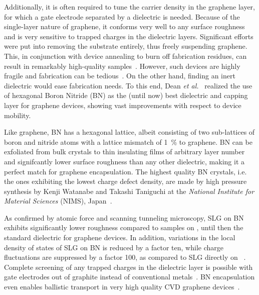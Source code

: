 Additionally, it is often required to tune the carrier density in the graphene layer, for which a gate electrode separated by a dielectric is needed.
% 
Because of the single-layer nature of graphene, it conforms very well to any surface roughness and is very sensitive to trapped charges in the dielectric layers.
%
Significant efforts were put into removing the substrate entirely, thus freely suspending graphene.
%
This, in conjunction with device annealing to burn off fabrication residues, can result in remarkably high-quality samples~\cite{duApproachingBallisticTransport2008a,rickhausBallisticInterferencesSuspended2013,mizunoBallisticlikeSupercurrentSuspended2013a,kiHighQualityMultiterminalSuspended2013,maurandFabricationBallisticSuspended2014,rickhausGateTuneableBeamsplitter2015,rickhausGuidingElectronsFewMode2015}.
% 
However, such devices are highly fragile and fabrication can be tedious~\cite{rickhausElectronOpticsBallistic2015}.
%
On the other hand, finding an inert dielectric would ease fabrication needs.
%
To this end, Dean \textit{et al.}~\cite{deanBoronNitrideSubstrates2010} realized the use of hexagonal Boron Nitride (BN) as the (until now) best dielectric and capping layer for graphene devices, showing vast improvements with respect to device mobility.


Like graphene, BN has a hexagonal lattice, albeit consisting of two sub-lattices of boron and nitride atoms with a lattice mismatch of \SI{1}{\percent} to graphene.
% 
BN can be exfoliated from bulk crystals to thin insulating films of arbitrary layer number and signifcantly lower surface roughness than any other dielectric, making it a perfect match for graphene encapsulation.
% 
The highest quality BN crystals, i.e. the ones exhibiting the lowest charge defect density, are made by high pressure synthesis by Kenji Watanabe and Takashi Taniguchi at the \textit{National Institute for Material Sciences} (NIMS), Japan~\cite{taniguchiSynthesisHighpurityBoron2007,zastrowMeetCrystalGrowers2019}.

As confirmed by atomic force and scanning tunneling microscopy, SLG on BN exhibits significantly lower roughness compared to samples on , until then the standard dielectric for graphene devices.
% 
In addition, variations in the local density of states of SLG on BN is reduced by a factor ten, while charge fluctuations are suppressed by a factor 100, as compared to SLG directly on ~\cite{xueScanningTunnellingMicroscopy2011,deckerLocalElectronicProperties2011}.
% 
Complete screening of any trapped charges in the dielectric layer is possible with gate electrodes out of graphite instead of conventional metals~\cite{ponomarenkoTunableMetalInsulator2011,ametNovelPhenomenaDriven2014}.
%
BN encapsulation even enables ballistic transport in very high quality CVD graphene devices~\cite{banszerusBallisticTransportExceeding2016a}.


